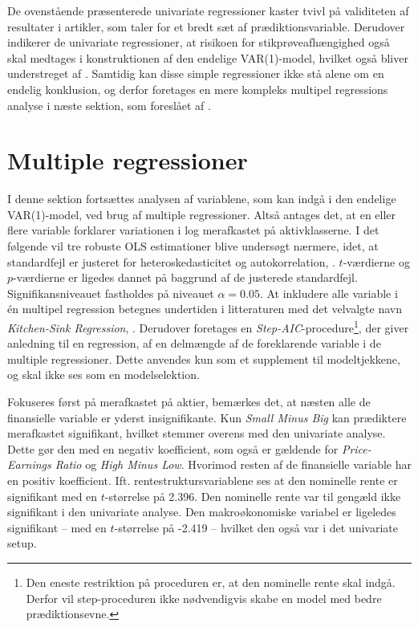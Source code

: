 \documentclass[
  a4paper,
  oneside]{memoir}
\begin{document}
De ovenstående præsenterede univariate regressioner kaster tvivl på validiteten af resultater i artikler, som taler for et bredt sæt af prædiktionsvariable. Derudover indikerer de univariate regressioner, at risikoen for stikprøveafhængighed også skal medtages i konstruktionen af den endelige VAR(1)-model, hvilket også bliver understreget af \citep{Goyal2007}. Samtidig kan disse simple regressioner ikke stå alene om en endelig konklusion, og derfor foretages en mere kompleks multipel regressions analyse i næste sektion, som foreslået af \citep{Goyal2007}.

\hypertarget{multreg}{%
\section{Multiple regressioner}\label{multreg}}

I denne sektion fortsættes analysen af variablene, som kan indgå i den endelige VAR(1)-model, ved brug af multiple regressioner. Altså antages det, at en eller flere variable forklarer variationen i log merafkastet på aktivklasserne. I det følgende vil tre robuste OLS estimationer blive undersøgt nærmere, idet, at standardfejl er justeret for heteroskedasticitet og autokorrelation, \citep{Newey1987}. \(t\)-værdierne og \(p\)-værdierne er ligedes dannet på baggrund af de justerede standardfejl. Signifikansniveauet fastholdes på niveauet \(\alpha=0.05\). At inkludere alle variable i én multipel regression betegnes undertiden i litteraturen med det velvalgte navn \emph{Kitchen-Sink Regression}, \citep{Goyal2007}. Derudover foretages en \emph{Step-AIC}-procedure\footnote{Den eneste restriktion på proceduren er, at den nominelle rente skal indgå. Derfor vil step-proceduren ikke nødvendigvis skabe en model med bedre prædiktionsevne.}, der giver anledning til en regression, af en delmængde af de foreklarende variable i de multiple regressioner. Dette anvendes kun som et supplement til modeltjekkene, og skal ikke ses som en modelselektion.

Fokuseres først på merafkastet på aktier, bemærkes det, at næsten alle de finansielle variable er yderst insignifikante. Kun \emph{Small Minus Big} kan prædiktere merafkastet signifikant, hvilket stemmer overens med den univariate analyse. Dette gør den med en negativ koefficient, som også er gældende for \emph{Price-Earnings Ratio} og \emph{High Minus Low}. Hvorimod resten af de finansielle variable har en positiv koefficient. Ift. rentestruktursvariablene ses at den nominelle rente er signifikant med en \(t\)-størrelse på 2.396. Den nominelle rente var til gengæld ikke signifikant i den univariate analyse. Den makroøkonomiske variabel er ligeledes signifikant -- med en \(t\)-størrelse på -2.419 -- hvilket den også var i det univariate setup.
\end{document}
